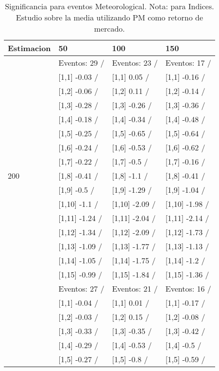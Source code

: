 \begin{table}

\caption{Significancia para eventos Meteorological. Nota: para Indices. Estudio sobre la media utilizando PM como retorno de mercado.}
\centering
\begin{tabular}[t]{llll}
\toprule
Estimacion & 50 & 100 & 150\\
\midrule
 & Eventos:  29 / & Eventos:  23 / & Eventos:  17 /\\
 & {}[1,1] -0.03  / & {}[1,1] 0.05  / & {}[1,1] -0.16  /\\
 & {}[1,2] -0.06  / & {}[1,2] 0.11  / & {}[1,2] -0.14  /\\
 & {}[1,3] -0.28  / & {}[1,3] -0.26  / & {}[1,3] -0.36  /\\
 & {}[1,4] -0.18  / & {}[1,4] -0.34  / & {}[1,4] -0.48  /\\
\addlinespace
 & {}[1,5] -0.25  / & {}[1,5] -0.65  / & {}[1,5] -0.64  /\\
 & {}[1,6] -0.24  / & {}[1,6] -0.53  / & {}[1,6] -0.62  /\\
 & {}[1,7] -0.22  / & {}[1,7] -0.5  / & {}[1,7] -0.16  /\\
200 & {}[1,8] -0.41  / & {}[1,8] -1.1  / & {}[1,8] -0.41  /\\
 & {}[1,9] -0.5  / & {}[1,9] -1.29  / & {}[1,9] -1.04  /\\
\addlinespace
 & {}[1,10] -1.1  / & {}[1,10] -2.09  / & {}[1,10] -1.98  /\\
 & {}[1,11] -1.24  / & {}[1,11] -2.04  / & {}[1,11] -2.14  /\\
 & {}[1,12] -1.34  / & {}[1,12] -2.09  / & {}[1,12] -1.73  /\\
 & {}[1,13] -1.09  / & {}[1,13] -1.77  / & {}[1,13] -1.13  /\\
 & {}[1,14] -1.05  / & {}[1,14] -1.75  / & {}[1,14] -1.2  /\\
\addlinespace
 & {}[1,15] -0.99  / & {}[1,15] -1.84  / & {}[1,15] -1.36  /\\
 & Eventos:  27 / & Eventos:  21 / & Eventos:  16 /\\
 & {}[1,1] -0.04  / & {}[1,1] 0.01  / & {}[1,1] -0.17  /\\
 & {}[1,2] -0.03  / & {}[1,2] 0.15  / & {}[1,2] -0.08  /\\
 & {}[1,3] -0.33  / & {}[1,3] -0.35  / & {}[1,3] -0.42  /\\
\addlinespace
 & {}[1,4] -0.29  / & {}[1,4] -0.53  / & {}[1,4] -0.5  /\\
 & {}[1,5] -0.27  / & {}[1,5] -0.8  / & {}[1,5] -0.59  /\\

\end{tabular}
\end{table}
